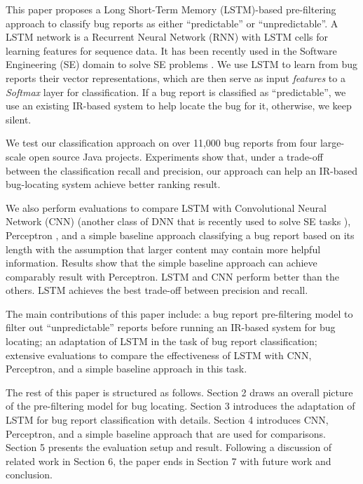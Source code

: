 This paper proposes a Long Short-Term Memory (LSTM)-based pre-filtering approach to classify bug reports as either ``predictable'' or ``unpredictable''. A LSTM network is a Recurrent Neural Network (RNN) with LSTM cells \cite{Hochreiter:1997:LSM:1246443.1246450} for learning features for sequence data. It has been recently used in the Software Engineering (SE) domain to solve SE problems \cite{8255666, Huo:2017:EUF:3172077.3172153}. We use LSTM to learn from bug reports their vector representations, which are then serve as input \textit{features} to a \textit{Softmax} layer for classification. If a bug report is classified as ``predictable'', we use an existing IR-based system to help locate the bug for it, otherwise, we keep silent.

We test our classification approach on over 11,000 bug reports from four large-scale open source Java projects. Experiments show that, under a trade-off between the classification recall and precision, our approach can help an IR-based bug-locating system achieve better ranking result.

We also perform evaluations to compare LSTM with Convolutional Neural Network (CNN) \cite{726791} (another class of DNN that is recently used to solve SE tasks \cite{Le:2015:IRS:2786805.2786880, Xu:2016:PSL:2970276.2970357, Mou:2016:CNN:3015812.3016002}), Perceptron \cite{Freund:1999:LMC:337859.337869, r-ppmisob-58}, and a simple baseline approach classifying a bug report based on its length with the assumption that larger content may contain more helpful information. Results show that the simple baseline approach can achieve comparably result with Perceptron. LSTM and CNN perform better than the others. LSTM achieves the best trade-off between precision and recall. 

The main contributions of this paper include: a bug report pre-filtering model to filter out ``unpredictable'' reports before running an IR-based system for bug locating; an adaptation of LSTM in the task of bug report classification; extensive evaluations to compare the effectiveness of LSTM with CNN, Perceptron, and a simple baseline approach in this task.

The rest of this paper is structured as follows. Section 2 draws an overall picture of the pre-filtering model for bug locating. Section 3 introduces the adaptation of LSTM for bug report classification with details. Section 4 introduces CNN, Perceptron, and a simple baseline approach that are used for comparisons. Section 5 presents the evaluation setup and result. Following a discussion of related work in Section 6, the paper ends in Section 7 with future work and conclusion.

